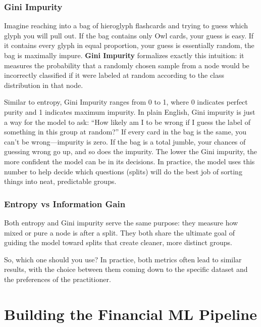 

\subsubsection{Gini Impurity}

Imagine reaching into a bag of hieroglyph flashcards and trying to guess which glyph you will pull out.
If the bag contains only Owl cards, your guess is easy.
If it contains every glyph in equal proportion, your guess is essentially random, the bag is maximally impure.
\textbf{Gini Impurity} formalizes exactly this intuition: it measures the probability that a randomly chosen sample
from a node would be incorrectly classified if it were labeled at random according to the class distribution in that node.

Similar to entropy, Gini Impurity ranges from 0 to 1, where 0 indicates perfect purity and 1 indicates maximum impurity.
In plain English, Gini impurity is just a way for the model to ask: ``How likely am I to be wrong if I guess the label of something in this group at random?''
If every card in the bag is the same, you can't be wrong---impurity is zero. If the bag is a total jumble, your chances of guessing wrong go up, and so does the impurity.
The lower the Gini impurity, the more confident the model can be in its decisions.
In practice, the model uses this number to help decide which questions (splits) will do the best job of sorting things into neat, predictable groups.

\subsubsection{Entropy vs Information Gain}

Both entropy and Gini impurity serve the same purpose: they measure how mixed or pure a node is after a split. 
They both share the ultimate goal of guiding the model toward splits that create cleaner, more distinct groups.

So, which one should you use? 
In practice, both metrics often lead to similar results, with the choice between them coming down to the specific dataset and the preferences of the practitioner.



\section{Building the Financial ML Pipeline}\label{sec:pipeline}

